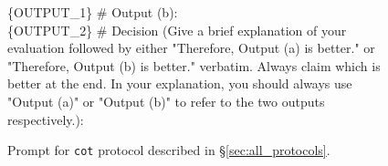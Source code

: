 \begin{figure*}[t!]
\begin{tcolorbox}[colback=black!3!white, colframe=black!70!white, title=CoT, fontupper=\footnotesize, fonttitle=\footnotesize]
\{OUTPUT\_1\}
\newline
\newline
\# Output (b): \\
\{OUTPUT\_2\}
\newline
\newline
\# Decision (Give a brief explanation of your evaluation followed by either "Therefore, Output (a) is better." or "Therefore, Output (b) is better." verbatim. Always claim which is better at the end. In your explanation, you should always use "Output (a)" or "Output (b)" to refer to the two outputs respectively.):
\end{tcolorbox}
\caption{Prompt for \texttt{cot} protocol described in \S\ref{sec:all_protocols}.}
\label{fig:prompt_cot}
\end{figure*}




